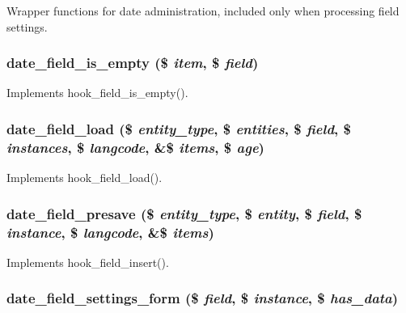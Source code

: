 Wrapper functions for date administration, included only when processing field settings. \hypertarget{date_8field_8inc_aedcb2a64f24594d3c65037e9eb2346e2}{
\subsubsection[{date\_\-field\_\-is\_\-empty}]{\setlength{\rightskip}{0pt plus 5cm}date\_\-field\_\-is\_\-empty (\$ {\em item}, \/  \$ {\em field})}}
\label{date_8field_8inc_aedcb2a64f24594d3c65037e9eb2346e2}
Implements hook\_\-field\_\-is\_\-empty(). \hypertarget{date_8field_8inc_a0d7b24400d26db6ee3792d916b76be54}{
\subsubsection[{date\_\-field\_\-load}]{\setlength{\rightskip}{0pt plus 5cm}date\_\-field\_\-load (\$ {\em entity\_\-type}, \/  \$ {\em entities}, \/  \$ {\em field}, \/  \$ {\em instances}, \/  \$ {\em langcode}, \/  \&\$ {\em items}, \/  \$ {\em age})}}
\label{date_8field_8inc_a0d7b24400d26db6ee3792d916b76be54}
Implements hook\_\-field\_\-load(). \hypertarget{date_8field_8inc_ac5f5698a39e9851297e225104340f307}{
\subsubsection[{date\_\-field\_\-presave}]{\setlength{\rightskip}{0pt plus 5cm}date\_\-field\_\-presave (\$ {\em entity\_\-type}, \/  \$ {\em entity}, \/  \$ {\em field}, \/  \$ {\em instance}, \/  \$ {\em langcode}, \/  \&\$ {\em items})}}
\label{date_8field_8inc_ac5f5698a39e9851297e225104340f307}
Implements hook\_\-field\_\-insert(). \hypertarget{date_8field_8inc_a5f070593dfcf73a90c953b2402e0739b}{
\subsubsection[{date\_\-field\_\-settings\_\-form}]{\setlength{\rightskip}{0pt plus 5cm}date\_\-field\_\-settings\_\-form (\$ {\em field}, \/  \$ {\em instance}, \/  \$ {\em has\_\-data})}}
